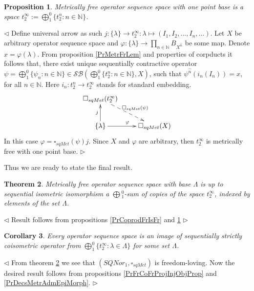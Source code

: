 \documentclass[12pt]{article}
\newtheorem{theorem}{Theorem}[subsection]
\newtheorem{proposition}[theorem]{Proposition}
\newtheorem{corollary}[theorem]{Corollary}
\newenvironment{proof}{\par $\triangleleft$}{$\triangleright$}
\begin{document}
\begin{proposition}\label{PrOnePtMetrFr} Metrically free operator sequence space with one point base is a space $t_2^{\infty} := \bigoplus_1^0 \{t_2^n: n \in \mathbb{N}\}$.
\end{proposition}
\begin{proof}
Define universal arrow as such $j:\{\lambda\}\to t_2^\infty:\lambda\mapsto(I_1,I_2,\ldots,I_n,\ldots)$. Let $X$ be arbitrary operator sequence space and 
$\varphi:\{\lambda\}\to \prod_{n \in \mathbb{N}} B_{X^{\wideparen{n}}}$ be some map. Denote $x=\varphi(\lambda)$. From proposition \ref{PrMetrFrLem} and properties of corpducts it  follows that, there exist unique sequentially contractive operator $\psi=\bigoplus_1^0\{\psi_n:n\in\mathbb{N}\}\in  \mathcal{SB}\left(\bigoplus_1^0\{ t_2^n:n\in\mathbb{N}\}, X\right)$, such that $\psi^{\wideparen{n}}(i_n(I_n)) = x$, for all $n \in \mathbb{N}$. Here $i_n:t_2^n\to t_2^\infty$ stands for standard embedding.
$$
\xymatrix{
{\square_{sqMet} (t_2^\infty)} \ar@{-->}[dr]^{\square_{sqMet} (\psi)} & \\
{\{\lambda\}} \ar[u]^{j} \ar[r]^{\varphi} &{\square_{sqMet} (X)}}
$$
In this case $\varphi=\square_{sqMet}(\psi) j$. Since $X$ and $\varphi$ are arbitrary, then $t_2^\infty$ is metrically free with one point base. 
\end{proof}

Thus we are ready to state the final result.

\begin{theorem}\label{ThMetrFrDesc} Metrically free operator sequence space with base $\Lambda$ is up to sequential isometric isomorphism a $\bigoplus{}_1^0$-sum of copies of the space $t_2^{\infty}$, indexed by elements of the set $\Lambda$. 
\end{theorem}
\begin{proof}
Result follows from propositions \ref{PrCoprodFrIsFr} and \ref{PrOnePtMetrFr}
\end{proof}

\begin{corollary}\label{CorSQSpaceIsImgMetrAdmEpiMorph}
Every operator sequence space is an image of sequentially strictly coisometric operator from $\bigoplus_1^0\{t_2^\infty:\lambda\in\Lambda\}$ for some set $\Lambda$.
\end{corollary}
\begin{proof}
From theorem \ref{ThMetrFrDesc} we see that $(SQNor_1,\square_{sqMet})$ is freedom-loving. Now the desired result follows from propositions \ref{PrFrCoFrProjInjObjProp} and \ref{PrDecsMetrAdmEpiMorph}.
\end{proof}
\end{document}
